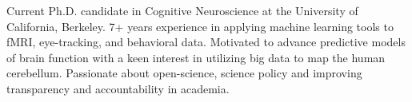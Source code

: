 

\begin{cvparagraph}

Current Ph.D. candidate in Cognitive Neuroscience at the University of California, Berkeley. 7+ years experience in applying machine learning tools to fMRI, eye-tracking, and behavioral data. Motivated to advance predictive models of brain function with a keen interest in 
utilizing big data to map the human cerebellum. Passionate about open-science, science policy and improving transparency and accountability in academia. 

\end{cvparagraph}

